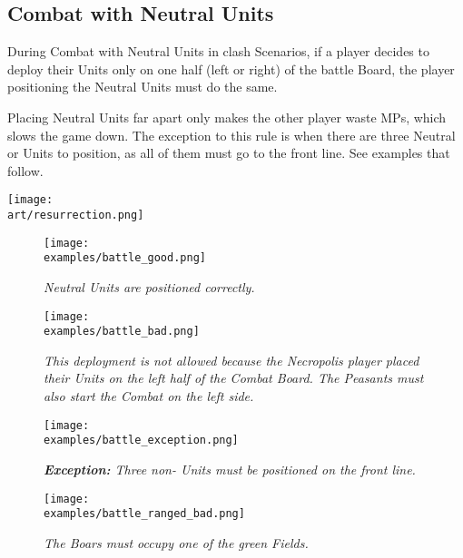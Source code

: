 \begin{multicols}{2}

\subsection*{Combat with Neutral Units}

During Combat with Neutral Units in clash Scenarios, if a player decides to deploy their Units only on one half (left or right) of the battle Board, the player positioning the Neutral Units must do the same.

Placing Neutral Units far apart only makes the other player waste MPs, which slows the game down.
The exception to this rule is when there are three Neutral  or  Units to position, as all of them must go to the front line.
See examples that follow.

\begin{center}
  \texttt{[image: \\art/resurrection.png]}
\end{center}

\end{multicols}

\begin{figure*}[!h]
  \mbox{}
  \hfill
  \begin{minipage}[t]{0.44\textwidth}
    \centering
    \texttt{[image: \\examples/battle\_good.png]}
    \caption[good protected]{\textit{Neutral Units are positioned correctly.}}
  \end{minipage}
  \hfill
  \begin{minipage}[t]{0.44\textwidth}
    \centering
    \texttt{[image: \\examples/battle\_bad.png]}
    \caption[bad protected]{\textit{This deployment is not allowed because the Necropolis player placed their Units on the left half of the Combat Board.
      The Peasants must also start the Combat on the left side.}}
  \end{minipage}
  \hfill
  \mbox{}
\end{figure*}

\clearpage

\begin{figure*}[!h]
  \mbox{}
  \hfill
  \begin{minipage}[t]{0.44\textwidth}
    \centering
    \texttt{[image: \\examples/battle\_exception.png]}
    \caption[exception protected]{\textit{\textbf{Exception:} Three non- Units must be positioned on the front line.}}
  \end{minipage}
  \hfill
  \begin{minipage}[t]{0.44\textwidth}
    \centering
    \texttt{[image: \\examples/battle\_ranged\_bad.png]}
    \caption[ranged protected]{\textit{The Boars must occupy one of the green Fields.}}
  \end{minipage}
  \hfill
  \mbox{}
\end{figure*}

